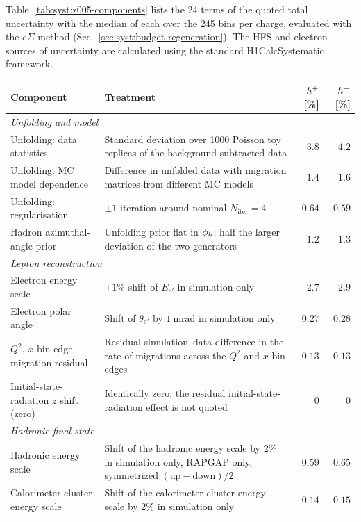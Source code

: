 Table~\ref{tab:syst:z005-components} lists the 24 terms of the quoted total uncertainty with the median of each over the 245 bins per charge, evaluated with the $e\Sigma$ method
(Sec.~\ref{sec:syst:budget-regeneration}). The HFS and electron sources of uncertainty are calculated using the standard H1CalcSystematic framework.

\begin{table}[h]
\centering
\small
\begin{tabular}{p{4.4cm}p{7.0cm}rr}
\toprule
Component & Treatment & $h^{+}$ [\%] & $h^{-}$ [\%] \\
\midrule
\multicolumn{4}{l}{\textit{Unfolding and model}} \\
Unfolding: data statistics & Standard deviation over 1000 Poisson toy replicas of the background-subtracted data & $3.8$ & $4.2$ \\
Unfolding: MC model dependence & Difference in unfolded data with migration matrices from different MC models & $1.4$ & $1.6$ \\
Unfolding: regularisation & $\pm1$ iteration around nominal $N_{\mathrm{iter}}=4$ & $0.64$ & $0.59$ \\
Hadron azimuthal-angle prior & Unfolding prior flat in $\phi_{h}$; half the larger deviation of the two generators & $1.2$ & $1.3$ \\
\midrule
\multicolumn{4}{l}{\textit{Lepton reconstruction}} \\
Electron energy scale & $\pm1\%$ shift of $E_{e'}$ in simulation only & $2.7$ & $2.9$ \\
Electron polar angle & Shift of $\theta_{e'}$ by $1~\mathrm{mrad}$ in simulation only & $0.27$ & $0.28$ \\
$Q^2$, $x$ bin-edge migration residual & Residual simulation--data difference in the rate of migrations across the $Q^2$ and $x$ bin edges & $0.13$ & $0.13$ \\
Initial-state-radiation $z$ shift (zero) & Identically zero; the residual initial-state-radiation effect is not quoted & $0$ & $0$ \\
\midrule
\multicolumn{4}{l}{\textit{Hadronic final state}} \\
Hadronic energy scale & Shift of the hadronic energy scale by 2\% in simulation only, RAPGAP only, symmetrized $(\mathrm{up}-\mathrm{down})/2$ & $0.59$ & $0.65$ \\
Calorimeter cluster energy scale & Shift of the calorimeter cluster energy scale by 2\% in simulation only & $0.14$ & $0.15$ \\

\end{tabular}
\end{table}
